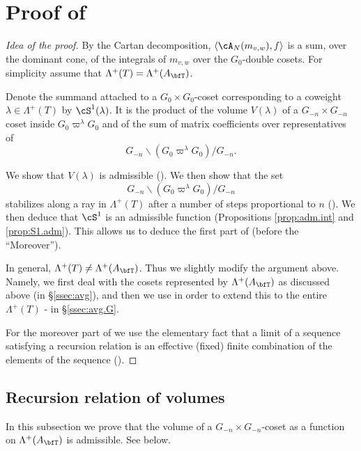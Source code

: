 \documentclass[12pt,a4paper]{amsart}%
\newcommand{\RamiA}[1]{{{#1}}}
\newcommand{\RamiC}[1]{{{#1}}}
\newcommand{\EitanD}[1]{{{#1}}}
\begin{document}
\section{Proof of }\label{ssec:KY}
\begin{proof}[Idea of the proof]
By
the Cartan decomposition, $\langle\cA_N(m_{v,w}),f\rangle$ is a sum, over the dominant
cone, of the integrals of $m_{v,w}$ over the $G_0$-double cosets.
For simplicity assume that $\Lambda^+(T)=\Lambda^+(A_\bfT)$.

\RamiA{Denote the summand 
attached to a $G_0\times G_0$-coset  corresponding to a coweight $\lambda\in \Lambda^+(T)$ by $\cS^1(\lambda)$. It} is the product of the volume $V(\lambda)$ of a $G_{-n}\times G_{-n}$ coset  inside $G_0\varpi^{\lambda} G_0$ and of the sum
 of matrix coefficients over representatives of 
 $$G_{-n} \backslash (G_0\varpi^{\lambda} G_0)/G_{-n}.$$

  We show that $V(\lambda)$  is admissible (). We then show that the set $$G_{-n} \backslash (G_0\varpi^{\lambda} G_0)/G_{-n}$$ 
stabilizes along a ray in $\Lambda^+(T)$ after a number of
steps proportional to $n$ ().
We then deduce that 
$\cS^1$ is an admissible function (Propositions \ref{prop:adm.int} and \ref{prop:S1.adm}). This allows us to deduce the first part of  (\EitanD{before the ``Moreover''}).

In general, $\Lambda^+(T)\neq \Lambda^+(A_\bfT)$. Thus we slightly modify the argument above. Namely, we first deal with the cosets represented by $\Lambda^+(A_\bfT)$ as discussed above (in \S \ref{ssec:avg}), and then we use  in order to extend this to the entire $\Lambda^+(T)$ - in \S \ref{ssec:avg.G}.  

For the moreover part of  we use the
elementary fact that a limit of a sequence satisfying a recursion relation is an effective \RamiC{(fixed)}
finite combination of the elements of the sequence ().    
\end{proof}
\subsection{Recursion relation of volumes}\label{ssec:vol}

In this subsection we prove that the volume of a $G_{-n}\times G_{-n}$-coset as a function on $\Lambda^+(A_\bfT)$ is admissible. See  below.
\end{document}
